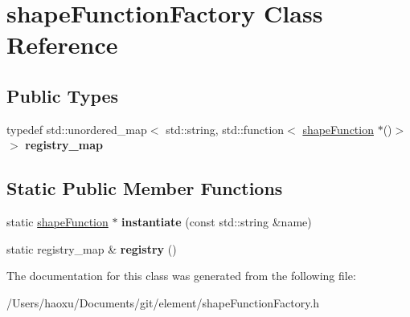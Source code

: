 \hypertarget{classshape_function_factory}{}\section{shape\+Function\+Factory Class Reference}
\label{classshape_function_factory}
\subsection*{Public Types}
\begin{DoxyCompactItemize}
\item 
\mbox{\label{classshape_function_factory_a0c038fdd103c0e10d3ad13d86545726d}} 
typedef std\+::unordered\+\_\+map$<$ std\+::string, std\+::function$<$ \hyperlink{classshape_function}{shape\+Function} $\ast$()$>$ $>$ {\bfseries registry\+\_\+map}
\end{DoxyCompactItemize}
\subsection*{Static Public Member Functions}
\begin{DoxyCompactItemize}
\item 
\mbox{\label{classshape_function_factory_ac5456182c4387f7df3bde22cb84e33ab}} 
static \hyperlink{classshape_function}{shape\+Function} $\ast$ {\bfseries instantiate} (const std\+::string \&name)
\item 
\mbox{\label{classshape_function_factory_ad737f9ef3bae823476331fa2ffc30610}} 
static registry\+\_\+map \& {\bfseries registry} ()
\end{DoxyCompactItemize}


The documentation for this class was generated from the following file\+:\begin{DoxyCompactItemize}
\item 
/\+Users/haoxu/\+Documents/git/element/shape\+Function\+Factory.\+h\end{DoxyCompactItemize}
